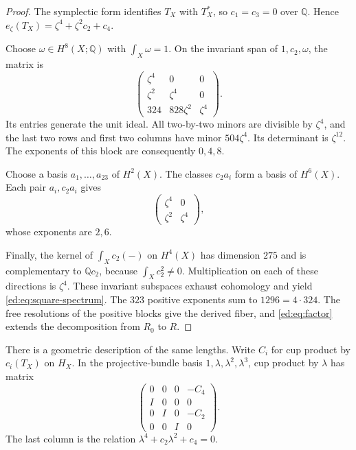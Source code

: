 \begin{proof}
The symplectic form identifies $T_X$ with $T_X^*$, so $c_1=c_3=0$
over $\mathbb Q$. Hence
$e_\zeta(T_X)=\zeta^4+\zeta^2c_2+c_4$.

Choose $\omega\in H^8(X;\mathbb Q)$ with $\int_X\omega=1$.
On the invariant span of $1,c_2,\omega$, the matrix is
\begin{equation}\label{ed:eq:square-core}
 \begin{pmatrix}
 \zeta^4&0&0\\
 \zeta^2&\zeta^4&0\\
 324&828\zeta^2&\zeta^4
 \end{pmatrix}.
\end{equation}
Its entries generate the unit ideal. All two-by-two minors are divisible
by $\zeta^4$, and the last two rows and first two columns have minor
$504\zeta^4$. Its determinant is $\zeta^{12}$. The exponents of this
block are consequently $0,4,8$.

Choose a basis $a_1,\ldots,a_{23}$ of $H^2(X)$. The classes
$c_2a_i$ form a basis of $H^6(X)$. Each pair $a_i,c_2a_i$ gives
\[
 \begin{pmatrix}\zeta^4&0\\\zeta^2&\zeta^4\end{pmatrix},
\]
whose exponents are $2,6$.

Finally, the kernel of $\int_Xc_2(-)$ on $H^4(X)$ has dimension
$275$ and is complementary to $\mathbb Qc_2$, because
$\int_Xc_2^2\ne0$. Multiplication on each of these directions is
$\zeta^4$. These invariant subspaces exhaust cohomology and yield
\eqref{ed:eq:square-spectrum}. The $323$ positive exponents sum to
$1296=4\cdot324$. The free resolutions of the positive blocks give
the derived fiber, and \eqref{ed:eq:factor} extends the decomposition
from $R_0$ to $R$.
\end{proof}

There is a geometric description of the same lengths. Write $C_i$ for
cup product by $c_i(T_X)$ on $H_X$. In the projective-bundle basis
$1,\lambda,\lambda^2,\lambda^3$, cup product by $\lambda$ has matrix
\begin{equation}\label{ed:eq:companion}
 \begin{pmatrix}
 0&0&0&-C_4\\
 I&0&0&0\\
 0&I&0&-C_2\\
 0&0&I&0
 \end{pmatrix}.
\end{equation}
The last column is the relation
$\lambda^4+c_2\lambda^2+c_4=0$.

